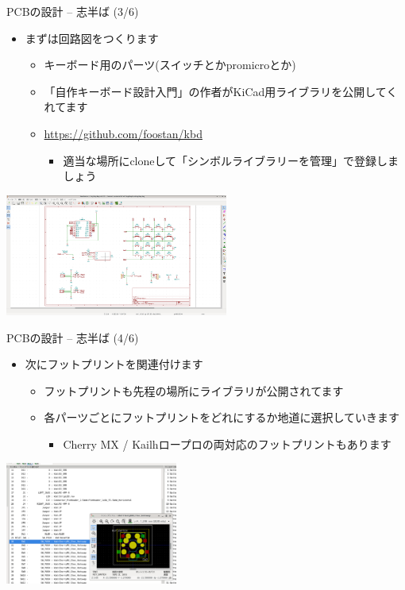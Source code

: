 \documentclass[cjk,dvipdfmx,10pt,compress,fragile%
hyperref={bookmarks=true,bookmarksnumbered=true,bookmarksopen=false,%
colorlinks=false,%
pdftitle={第 134 回 関西 Debian 勉強会},%
pdfauthor={小林},%
pdfsubject={資料},%
}]{beamer}
\begin{document}
\begin{frame}[fragile,t]{PCBの設計 -- 志半ば (3/6)}
 \begin{itemize}
  \item まずは回路図をつくります
	\begin{itemize}
	 \item キーボード用のパーツ(スイッチとかpromicroとか)
	 \item 「自作キーボード設計入門」の作者がKiCad用ライブラリを公開してくれてます
	 \item \url{https://github.com/foostan/kbd}
	       \begin{itemize}
		\item 適当な場所にcloneして「シンボルライブラリーを管理」で登録しましょう
	       \end{itemize}
	\end{itemize}
 \end{itemize}
 \begin{center}
  \includegraphics[keepaspectratio,height=4cm]{./img/kicad-schematic.png}
 \end{center}
\end{frame}

\begin{frame}[fragile,t]{PCBの設計 -- 志半ば (4/6)}
 \begin{itemize}
  \item 次にフットプリントを関連付けます
	\begin{itemize}
	 \item フットプリントも先程の場所にライブラリが公開されてます
	 \item 各パーツごとにフットプリントをどれにするか地道に選択していきます
	       \begin{itemize}
		\item Cherry MX / Kailhロープロの両対応のフットプリントもあります
	       \end{itemize}
	\end{itemize}
 \end{itemize}
 \begin{center}
  \includegraphics[keepaspectratio,height=4cm]{./img/kicad-footprint.png}
 \end{center}
\end{frame}
\end{document}
